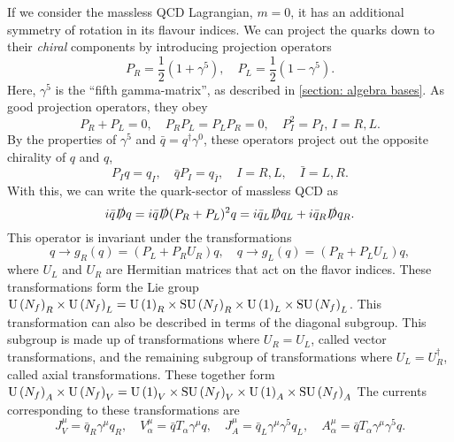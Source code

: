If we consider the massless QCD Lagrangian, $m = 0$, it has an additional symmetry of rotation in its flavour indices.
We can project the quarks down to their \emph{chiral} components by introducing projection operators
\begin{equation}
    P_R = \frac{1}{2}\left(1 + \gamma^5\right), \quad
    P_L = \frac{1}{2}\left(1 - \gamma^5\right).
\end{equation}
%
Here, $\gamma^5$ is the ``fifth gamma-matrix'', as described in \autoref{section: algebra bases}.
As good projection operators, they obey
%
\begin{equation}
    P_R + P_L = 0, \quad P_R P_L = P_L P_R = 0, \quad P_I^2 = P_I, \, I=R, L.
\end{equation}
%
By the properties of $\gamma^5$ and $\bar q = q^\dagger\gamma^0$, these operators project out the opposite chirality of $q$ and $q$,
%
\begin{equation}
    P_I q = q_I, \quad \bar q  P_I  = q_{\bar I},\quad
    I = R, L, \quad \bar I = L, R. 
\end{equation}
%
With this, we can write the quark-sector of massless QCD as
%
\begin{equation}
    i \bar q \slashed D q
    = i \bar q \slashed D (P_R + P_L)^2 q
    = i \bar q_L \slashed D q_L + i \bar q_R \slashed D q_R.
\end{equation}
%
This operator is invariant under the transformations
%
\begin{equation}
    q \rightarrow g_R(q) = (P_L + P_R U_R) q, \quad
    q \rightarrow g_L(q) = (P_R + P_L U_L) q,
\end{equation}
%
where $U_L$ and $U_R$ are Hermitian matrices that act on the flavor indices.
These transformations form the Lie group $\text{U}\left(N_f\right)_R \times \text{U}\left(N_f\right)_L = \text{U}\left(1\right)_R \times \text{SU}\left(N_f\right)_R \times \text{U}\left(1\right)_L \times \text{SU}\left(N_f\right)_L $.
This transformation can also be described in terms of the diagonal subgroup.
This subgroup is made up of transformations where $U_R = U_L$, called vector transformations, and the remaining subgroup of transformations where $U_L =  U_R^\dagger$, called axial transformations.
These together form $\text{U}\left(N_f\right)_A \times \text{U}\left(N_f\right)_V= \text{U}\left(1\right)_V \times \text{SU}\left(N_f\right)_V \times \text{U}\left(1\right)_A \times \text{SU}\left(N_f\right)_A $
The currents corresponding to these transformations are
%
\begin{equation}
    \label{conserved currents qcd}
    J_V^\mu = \bar q_R \gamma^\mu q_R, \quad
    V^\mu_\alpha =  \bar q T_\alpha \gamma^\mu q, \quad
    J_A^\mu = \bar q_L \gamma^\mu \gamma^5 q_L, \quad
    A^\mu_\alpha = \bar q T_\alpha \gamma^\mu \gamma^5 q.
\end{equation}
